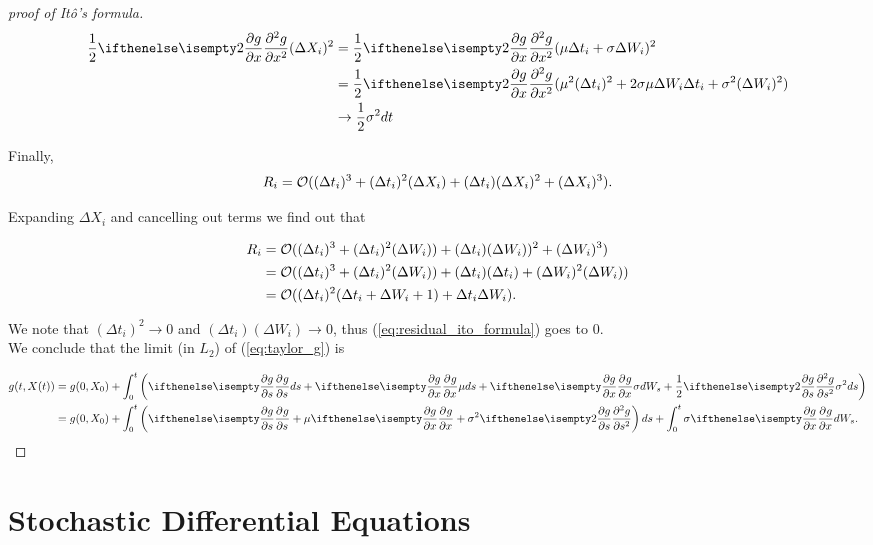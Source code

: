 \documentclass[../TGMAFFIRO.tex]{subfiles}
\begin{document}
\begin{proof}[proof of It\^o's formula]
\begin{align}
\frac{1}{2}\partialwrt[2]{g}{x} (\Delta X_i)^2 &= \frac{1}{2}\partialwrt[2]{g}{x} (\mu\Delta t_i + \sigma \Delta W_i)^2 \nonumber\\
&= \frac{1}{2}\partialwrt[2]{g}{x} (\mu^2 (\Delta t_i)^2 + 2\sigma\mu \Delta W_i \Delta t_i + \sigma^2 (\Delta W_i)^2) \nonumber\\
&\to \frac{1}{2} \sigma^2 dt
\end{align}

Finally, 
\begin{equation}
  R_i = \mathcal{O}((\Delta t_i)^3 + (\Delta t_i)^2(\Delta X_i) + (\Delta t_i)(\Delta X_i)^2 + (\Delta X_i)^3).
\end{equation}

Expanding $\Delta X_i$ and cancelling out terms we find out that

\begin{align}
  R_i &= \mathcal{O}((\Delta t_i)^3 + (\Delta t_i)^2(\Delta W_i)) + (\Delta t_i)(\Delta W_i))^2 + (\Delta W_i)^3) \nonumber \\
  	&= \mathcal{O}((\Delta t_i)^3 + (\Delta t_i)^2(\Delta W_i)) + (\Delta t_i)(\Delta t_i) + (\Delta W_i)^2(\Delta W_i))\nonumber \\
  	&= \mathcal{O}((\Delta t_i)^2(\Delta t_i + \Delta W_i + 1) + \Delta t_i \Delta W_i) \label{eq:residual_ito_formula}.
\end{align}

We note that $(\Delta t_i)^2 \to 0$ and $(\Delta t_i)(\Delta W_i) \to 0$, thus (\ref{eq:residual_ito_formula}) goes to 0.\\

We conclude that the limit (in $L_2$) of (\ref{eq:taylor_g}) is

\begin{align}
	g(t, X(t)) &= g(0, X_0) + \int_0^t\left( \partialwrt{g}{s}ds + \partialwrt{g}{x}{\mu ds} + \partialwrt{g}{x}{\sigma dW_s} + \frac{1}{2}\partialwrt[2]{g}{s}{\sigma^2 ds} \right)\\
			 &= g(0, X_0) + \int_0^t\left(\partialwrt{g}{s} + \mu \partialwrt{g}{x} +\sigma^2 \partialwrt[2]{g}{s} \right)ds + \int_0^t\sigma \partialwrt{g}{x}{dW_s}.
\end{align}
\end{proof}

\begin{theorem}
	
\end{theorem}
\section{Stochastic Differential Equations}
\end{document}
